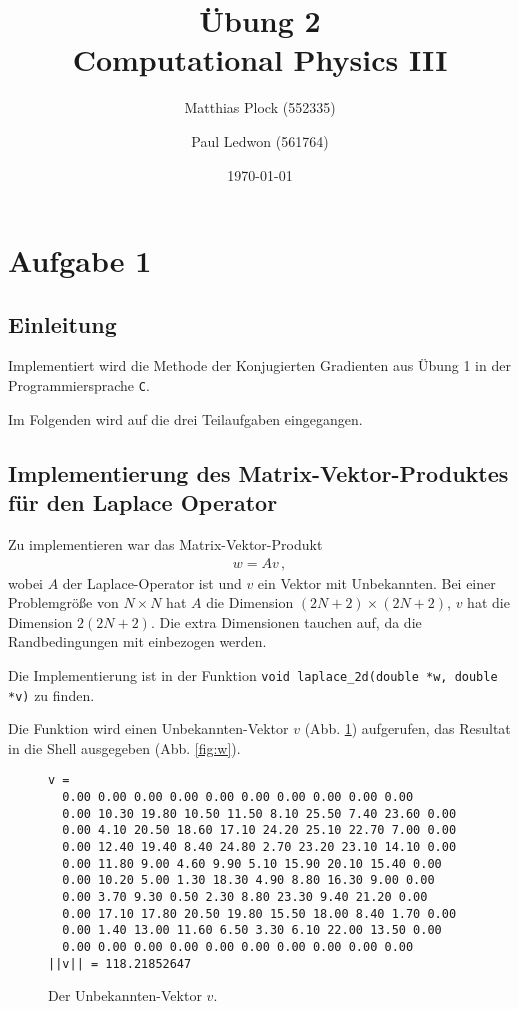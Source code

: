 \documentclass[10pt,a4paper]{article}
\title{Übung 2 \\Computational Physics III}
\author{Matthias Plock (552335) \and Paul Ledwon (561764)}
\date{\today}
\begin{document}
\maketitle
\tableofcontents

\pagestyle{myheadings}                  %

\section{Aufgabe 1}

\subsection{Einleitung}

Implementiert wird die Methode der Konjugierten Gradienten aus Übung 1 in der
Programmiersprache \texttt{C}.

Im Folgenden wird auf die drei Teilaufgaben eingegangen.

\subsection{Implementierung des Matrix-Vektor-Produktes für den Laplace
  Operator}

Zu implementieren war das Matrix-Vektor-Produkt
\begin{align*}
  w = Av \,,
\end{align*}
wobei $A$ der Laplace-Operator ist und $v$ ein Vektor mit Unbekannten.
Bei einer Problemgröße von $N\times N$ hat $A$ die Dimension $(2N+2)\times
(2N+2)$, $v$ hat die Dimension $2 (2N+2)$. Die extra Dimensionen tauchen auf, da
die Randbedingungen mit einbezogen werden.

Die Implementierung ist in der Funktion \texttt{void laplace\_2d(double *w,
  double *v)} zu finden.

Die Funktion wird einen Unbekannten-Vektor $v$ (Abb. \ref{fig:v}) aufgerufen,
das Resultat in die Shell ausgegeben (Abb. \ref{fig:w}).

\begin{figure}[H]
  \centering
\begin{verbatim}
v = 
  0.00 0.00 0.00 0.00 0.00 0.00 0.00 0.00 0.00 0.00 
  0.00 10.30 19.80 10.50 11.50 8.10 25.50 7.40 23.60 0.00 
  0.00 4.10 20.50 18.60 17.10 24.20 25.10 22.70 7.00 0.00 
  0.00 12.40 19.40 8.40 24.80 2.70 23.20 23.10 14.10 0.00 
  0.00 11.80 9.00 4.60 9.90 5.10 15.90 20.10 15.40 0.00 
  0.00 10.20 5.00 1.30 18.30 4.90 8.80 16.30 9.00 0.00 
  0.00 3.70 9.30 0.50 2.30 8.80 23.30 9.40 21.20 0.00 
  0.00 17.10 17.80 20.50 19.80 15.50 18.00 8.40 1.70 0.00 
  0.00 1.40 13.00 11.60 6.50 3.30 6.10 22.00 13.50 0.00 
  0.00 0.00 0.00 0.00 0.00 0.00 0.00 0.00 0.00 0.00 
||v|| = 118.21852647
\end{verbatim}
  \caption{Der Unbekannten-Vektor $v$.}
  \label{fig:v}
\end{figure}
\end{document}
